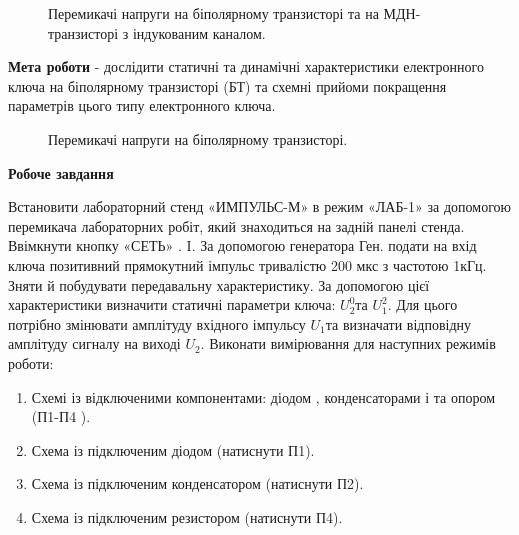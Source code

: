 \documentclass[a4paper,14pt]{extreport}
\begin{document}
\begin{figure}[h]
	\caption{Перемикачі напруги на біполярному транзисторі та на МДН-транзисторі з індукованим каналом.}
	\label{ris1}
\end{figure}

\textbf{Мета роботи} - дослідити статичні та динамічні характеристики
електронного ключа на біполярному транзисторі (БТ) та схемні прийоми
покращення параметрів цього типу електронного ключа.

\begin{figure}[h]
	\caption{Перемикачі напруги на біполярному транзисторі.}
	\label{ris2}
\end{figure}


\begin{center}
\textbf{Робоче завдання}
\end{center}
Встановити лабораторний стенд «ИМПУЛЬС-М» в режим «ЛАБ-1» за допомогою перемикача лабораторних робіт, який знаходиться на задній панелі стенда. 
Ввімкнути кнопку «СЕТЬ» .
I. За допомогою генератора Ген. подати на вхід ключа позитивний прямокутний імпульс тривалістю 200 мкс з частотою 1кГц. 
Зняти й побудувати передавальну характеристику. За допомогою цієї характеристики визначити статичні параметри ключа: $U_2^0$та $U_1^2$. Для цього потрібно змінювати амплітуду вхідного імпульсу $U_1$та визначати відповідну амплітуду сигналу на виході $U_2$. 
Виконати вимірювання для наступних режимів роботи:
\begin{enumerate}
	\item Схемі із відключеними компонентами: діодом , конденсаторами  і  та опором  (П1-П4 ). 
    \item Схема із підключеним діодом  (натиснути П1).
    \item Схема із підключеним конденсатором  (натиснути П2).
    \item Схема із підключеним резистором  (натиснути П4).
\end{enumerate}
 
\end{document}
